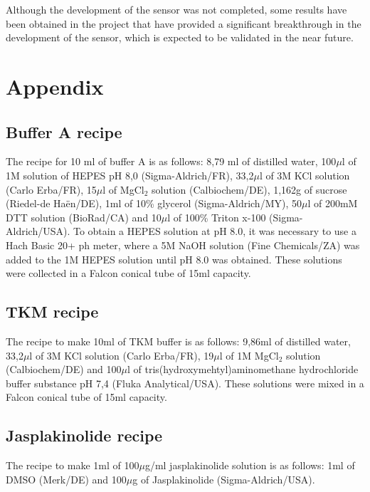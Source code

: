 \documentclass[12pt, a4paper]{article} %
\begin{document}
Although the development of the sensor was not completed, some results have been obtained in the project that have provided a significant breakthrough in the development of the sensor, which is expected to be validated in the near future.

\newpage
\setlength{\parskip}{0mm}

\pagestyle{empty}



\newpage
\setlength{\parskip}{0mm}
\section{Appendix}

\subsection{Buffer A recipe}

The recipe for 10 ml of buffer A is as follows: 8,79 ml of distilled water, 100$\mu$l of 1M solution of HEPES pH 8,0 (Sigma-Aldrich/FR), 33,2$\mu$l of 3M KCl solution (Carlo Erba/FR), 15$\mu$l of MgCl$_{2}$ solution (Calbiochem/DE), 1,162g of sucrose (Riedel-de Haën/DE), 1ml of 10\% glycerol (Sigma-Aldrich/MY), 50$\mu$l of 200mM DTT solution (BioRad/CA) and 10$\mu$l of 100\% Triton x-100 (Sigma-Aldrich/USA). To obtain a HEPES solution at pH 8.0, it was necessary to use a Hach Basic 20+ ph meter, where a 5M NaOH solution (Fine Chemicals/ZA) was added to the 1M HEPES solution until pH 8.0 was obtained. These solutions were collected in a Falcon conical tube of 15ml capacity. 

\subsection{TKM recipe}

The recipe to make 10ml of TKM buffer is as follows: 9,86ml of distilled water, 33,2$\mu$l of 3M KCl solution (Carlo Erba/FR), 19$\mu$l of 1M MgCl$_{2}$ solution (Calbiochem/DE) and 100$\mu$l of tris(hydroxymehtyl)aminomethane hydrochloride buffer substance pH 7,4 (Fluka Analytical/USA). These solutions were mixed in a Falcon conical tube of 15ml capacity.

\subsection{Jasplakinolide recipe}

The recipe to make 1ml of 100$\mu$g/ml jasplakinolide solution is as follows: 1ml of DMSO (Merk/DE) and 100$\mu$g of Jasplakinolide (Sigma-Aldrich/USA).
\end{document}
